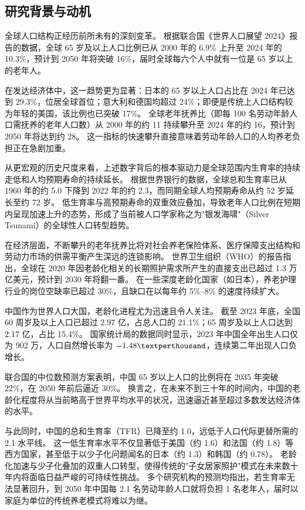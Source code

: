 \documentclass[12pt,a4paper]{ctexart}
\begin{document}
\subsection{研究背景与动机}

全球人口结构正经历前所未有的深刻变革。
根据联合国《世界人口展望 2024》报告的数据，全球 65 岁及以上人口比例已从 2000 年的 6.9\% 上升至 2024 年的 10.3\%，预计到 2050 年将突破 16\%，届时全球每六个人中就有一位是 65 岁以上的老年人。

在发达经济体中，这一趋势更为显著：日本的 65 岁以上人口占比在 2024 年已达到 29.3\%，位居全球首位；意大利和德国均超过 24\%；即便是传统上人口结构较为年轻的美国，该比例也已突破 17\%。
全球老年抚养比（即每 100 名劳动年龄人口需抚养的老年人口数）从 2000 年的约 11 持续攀升至 2024 年的约 16，预计到 2050 年将达到约 28。
这一指标的快速攀升直接意味着劳动年龄人口的人均养老负担正在急剧加重。

从更宏观的历史尺度来看，上述数字背后的根本驱动力是全球范围内生育率的持续走低和人均预期寿命的持续延长。
根据世界银行的数据，全球总和生育率已从 1960 年的约 5.0 下降到 2022 年的约 2.3，而同期全球人均预期寿命从约 52 岁延长至约 72 岁。
低生育率与高预期寿命的双重效应叠加，导致老年人口比例在短期内呈现加速上升的态势，形成了当前被人口学家称之为"银发海啸"（Silver Tsunami）的全球性人口转型趋势。

在经济层面，不断攀升的老年抚养比将对社会养老保险体系、医疗保障支出结构和劳动力市场的供需平衡产生深远的连锁影响。
世界卫生组织（WHO）的报告指出，全球在 2020 年因老龄化相关的长期照护需求所产生的直接支出已超过 1.3 万亿美元，预计到 2030 年将翻一番。
在一些深度老龄化国家（如日本），养老护理行业的岗位空缺率已超过 30\%，且缺口在以每年约 5\%--8\% 的速度持续扩大。

中国作为世界人口大国，老龄化进程尤为迅速且令人关注。
截至 2023 年底，全国 60 周岁及以上人口已超过 2.97 亿，占总人口的 21.1\%；65 周岁及以上人口达到 2.17 亿，占比 15.4\%。
国家统计局的数据同时显示，2023 年中国全年出生人口仅为 902 万，人口自然增长率为 $-1.48\textperthousand$，连续第二年出现人口负增长。

联合国的中位数预测方案表明，中国 65 岁以上人口的比例将在 2035 年突破 22\%，在 2050 年前后逼近 30\%。
换言之，在未来不到三十年的时间内，中国的老龄化程度将从当前略高于世界平均水平的状况，迅速逼近甚至超过多数发达经济体的水平。

与此同时，中国的总和生育率（TFR）已降至约 1.0，远低于人口代际更替所需的 2.1 水平线。
这一低生育率水平不仅显著低于美国（约 1.6）和法国（约 1.8）等西方国家，甚至低于以少子化问题闻名的日本（约 1.3）和韩国（约 0.78）。
老龄化加速与少子化叠加的双重人口转型，使得传统的"子女居家照护"模式在未来数十年内将面临日益严峻的可持续性挑战。
多个研究机构的预测均指出，若生育率无法显著回升，到 2050 年中国每 2.1 名劳动年龄人口就将负担 1 名老年人，届时以家庭为单位的传统养老模式将难以为继。
\end{document}
